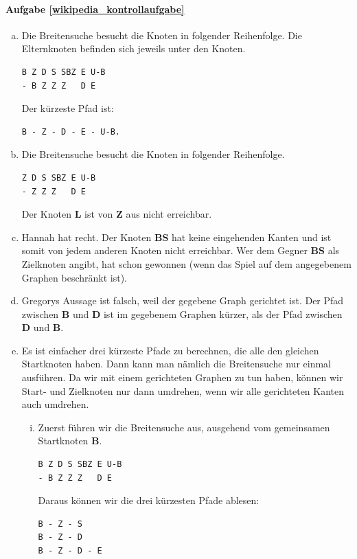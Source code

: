 \paragraph{Aufgabe \ref{wikipedia_kontrollaufgabe}}
\begin{enumerate}[(a)]
\item Die Breitensuche besucht die Knoten in folgender Reihenfolge. Die Elternknoten befinden sich jeweils unter den Knoten.
\begin{lstlisting}[mathescape]
B Z D S SBZ E U-B
- B Z Z Z   D E
\end{lstlisting}
Der kürzeste Pfad ist:
\begin{lstlisting}[mathescape]
B - Z - D - E - U-B.
\end{lstlisting}

\item Die Breitensuche besucht die Knoten in folgender Reihenfolge.
\begin{lstlisting}[mathescape]
Z D S SBZ E U-B
- Z Z Z   D E
\end{lstlisting}
Der Knoten \textbf{L} ist von \textbf{Z} aus nicht erreichbar.

\item Hannah hat recht. Der Knoten \textbf{BS} hat keine eingehenden Kanten und ist somit von jedem anderen Knoten nicht erreichbar. Wer dem Gegner \textbf{BS} als Zielknoten angibt, hat schon gewonnen (wenn das Spiel auf dem angegebenem Graphen beschränkt ist).

\item Gregorys Aussage ist falsch, weil der gegebene Graph gerichtet ist. Der Pfad zwischen \textbf{B} und \textbf{D} ist im gegebenem Graphen kürzer, als der Pfad zwischen \textbf{D} und \textbf{B}.

\item Es ist einfacher drei kürzeste Pfade zu berechnen, die alle den gleichen Startknoten haben. Dann kann man nämlich die Breitensuche nur einmal ausführen. Da wir mit einem gerichteten Graphen zu tun haben, können wir Start- und Zielknoten nur dann umdrehen, wenn wir alle gerichteten Kanten auch umdrehen.
\begin{enumerate}[(i)]
\item Zuerst führen wir die Breitensuche aus, ausgehend vom gemeinsamen Startknoten  \textbf{B}.
\begin{lstlisting}[mathescape]
B Z D S SBZ E U-B
- B Z Z Z   D E
\end{lstlisting}
Daraus können wir die drei kürzesten Pfade ablesen:
\begin{lstlisting}[mathescape]
B - Z - S
B - Z - D
B - Z - D - E
\end{lstlisting}


\end{enumerate}
\end{enumerate}
